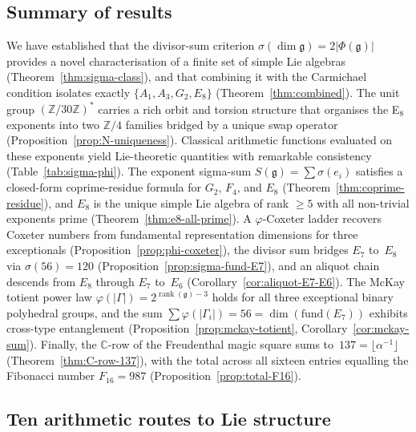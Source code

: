 \documentclass[11pt]{amsart}
\theoremstyle{plain}
\theoremstyle{definition}
\theoremstyle{remark}
\newcommand{\fg}{\mathfrak{g}}
\renewcommand{\Phi}{\varPhi}
\newcommand{\rank}{\operatorname{rank}}
\begin{document}
\subsection{Summary of results}

We have established that the divisor-sum criterion
$\sigma(\dim\fg) = 2|\Phi(\fg)|$ provides a novel characterisation of a
finite set of simple Lie algebras (Theorem~\ref{thm:sigma-class}),
and that combining it with the Carmichael condition isolates exactly
$\{A_1, A_3, G_2, E_8\}$ (Theorem~\ref{thm:combined}).  The unit group
$(\mathbb{Z}/30\mathbb{Z})^*$ carries a rich orbit and torsion structure
that organises the E$_8$ exponents into two $\mathbb{Z}/4$ families
bridged by a unique swap operator (Proposition~\ref{prop:N-uniqueness}).
Classical arithmetic functions evaluated on these exponents yield
Lie-theoretic quantities with remarkable consistency
(Table~\ref{tab:sigma-phi}).  The exponent sigma-sum
$S(\fg) = \sum\sigma(e_i)$ satisfies a closed-form coprime-residue
formula for $G_2$, $F_4$, and $E_8$
(Theorem~\ref{thm:coprime-residue}), and $E_8$ is the unique
simple Lie algebra of rank $\ge 5$ with all non-trivial exponents
prime (Theorem~\ref{thm:e8-all-prime}).
A $\varphi$-Coxeter ladder recovers Coxeter numbers from fundamental
representation dimensions for three exceptionals
(Proposition~\ref{prop:phi-coxeter}), the divisor sum bridges
$E_7$ to~$E_8$ via $\sigma(56) = 120$ (Proposition~\ref{prop:sigma-fund-E7}),
and an aliquot chain descends from $E_8$ through $E_7$ to~$E_6$
(Corollary~\ref{cor:aliquot-E7-E6}).
The McKay totient power law $\varphi(|\Gamma|) = 2^{\rank(\fg)-3}$
holds for all three exceptional binary polyhedral groups, and
the sum $\sum\varphi(|\Gamma_i|) = 56 = \dim(\mathrm{fund}(E_7))$
exhibits cross-type entanglement
(Proposition~\ref{prop:mckay-totient},
Corollary~\ref{cor:mckay-sum}).
Finally, the $\mathbb{C}$-row of the Freudenthal magic square sums
to~$137 = \lfloor\alpha^{-1}\rfloor$ (Theorem~\ref{thm:C-row-137}),
with the total across all sixteen entries equalling the Fibonacci
number $F_{16} = 987$ (Proposition~\ref{prop:total-F16}).

\subsection{Ten arithmetic routes to Lie structure}
\end{document}
